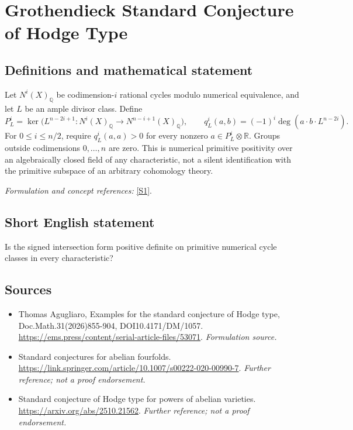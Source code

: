 \documentclass[11pt]{article}
\begin{document}
\section*{\texorpdfstring{Grothendieck Standard Conjecture of Hodge Type}{Grothendieck Standard Conjecture of Hodge Type}}\label{30006720}
\subsection{Definitions and mathematical statement}
Let $N^i(X)_{{\mathbb{Q}}}$ be codimension-$i$ rational cycles modulo numerical equivalence, and let $L$ be an ample divisor class. Define
\[
 P_L^i=\ker\bigl(L^{n-2i+1}:N^i(X)_{{\mathbb{Q}}}\to N^{n-i+1}(X)_{{\mathbb{Q}}}\bigr),
 \qquad q_L^i(a,b)=(-1)^i\deg(a\cdot b\cdot L^{n-2i}).
\]
For $0\le i\le n/2$, require $q_L^i(a,a)>0$ for every nonzero $a\in P_L^i\otimes{\mathbb{R}}$. Groups outside codimensions $0,\ldots,n$ are zero. This is numerical primitive positivity over an algebraically closed field of any characteristic, not a silent identification with the primitive subspace of an arbitrary cohomology theory.
\par\smallskip\textit{Formulation and concept references:} \href{https://ems.press/content/serial-article-files/53071}{[S1]}.

\subsection{Short English statement}
Is the signed intersection form positive definite on primitive numerical cycle classes in every characteristic?
\subsection{Sources}
\begin{itemize}
\item[S1]Thomas Agugliaro, Examples for the standard conjecture of Hodge type, Doc.Math.31(2026)855-904, DOI10.4171/DM/1057.
\url{https://ems.press/content/serial-article-files/53071}.
\textit{Formulation source.}
\item[S2]Standard conjectures for abelian fourfolds.
\url{https://link.springer.com/article/10.1007/s00222-020-00990-7}.
\textit{Further reference; not a proof endorsement.}
\item[S3]Standard conjecture of Hodge type for powers of abelian varieties.
\url{https://arxiv.org/abs/2510.21562}.
\textit{Further reference; not a proof endorsement.}
\end{itemize}
\end{document}
